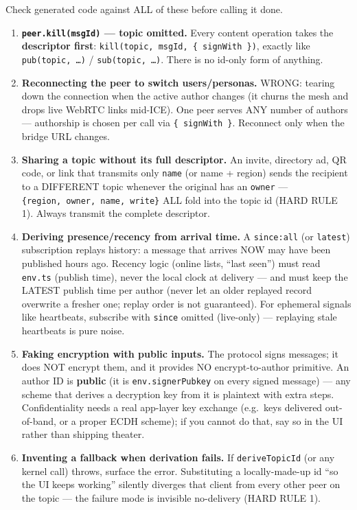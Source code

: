 \documentclass[
  nobib]{tufte-handout}
\providecommand{\tightlist}{%
  \setlength{\itemsep}{0pt}\setlength{\parskip}{0pt}}
\begin{document}
Check generated code against ALL of these before calling it done.

\begin{enumerate}
\def\labelenumi{\arabic{enumi}.}
\tightlist
\item
  \textbf{\texttt{peer.kill(msgId)} --- topic omitted.} Every content
  operation takes the \textbf{descriptor first}:
  \texttt{kill(topic,\ msgId,\ \{\ signWith\ \})}, exactly like
  \texttt{pub(topic,\ …)} / \texttt{sub(topic,\ …)}. There is no id-only
  form of anything.
\item
  \textbf{Reconnecting the peer to switch users/personas.} WRONG:
  tearing down the connection when the active author changes (it churns
  the mesh and drops live WebRTC links mid-ICE). One peer serves ANY
  number of authors --- authorship is chosen per call via
  \texttt{\{\ signWith\ \}}. Reconnect only when the bridge URL changes.
\item
  \textbf{Sharing a topic without its full descriptor.} An invite,
  directory ad, QR code, or link that transmits only \texttt{name} (or
  name + region) sends the recipient to a DIFFERENT topic whenever the
  original has an \texttt{owner} ---
  \texttt{\{region,\ owner,\ name,\ write\}} ALL fold into the topic id
  (HARD RULE 1). Always transmit the complete descriptor.
\item
  \textbf{Deriving presence/recency from arrival time.} A
  \texttt{since:\textquotesingle{}all\textquotesingle{}} (or
  \texttt{\textquotesingle{}latest\textquotesingle{}}) subscription
  replays history: a message that arrives NOW may have been published
  hours ago. Recency logic (online lists, ``last seen'') must read
  \texttt{env.ts} (publish time), never the local clock at delivery ---
  and must keep the LATEST publish time per author (never let an older
  replayed record overwrite a fresher one; replay order is not
  guaranteed). For ephemeral signals like heartbeats, subscribe with
  \texttt{since} omitted (live-only) --- replaying stale heartbeats is
  pure noise.
\item
  \textbf{Faking encryption with public inputs.} The protocol signs
  messages; it does NOT encrypt them, and it provides NO
  encrypt-to-author primitive. An author ID is \textbf{public} (it is
  \texttt{env.signerPubkey} on every signed message) --- any scheme that
  derives a decryption key from it is plaintext with extra steps.
  Confidentiality needs a real app-layer key exchange (e.g.~keys
  delivered out-of-band, or a proper ECDH scheme); if you cannot do
  that, say so in the UI rather than shipping theater.
\item
  \textbf{Inventing a fallback when derivation fails.} If
  \texttt{deriveTopicId} (or any kernel call) throws, surface the error.
  Substituting a locally-made-up id ``so the UI keeps working'' silently
  diverges that client from every other peer on the topic --- the
  failure mode is invisible no-delivery (HARD RULE 1).
\end{enumerate}
\end{document}

